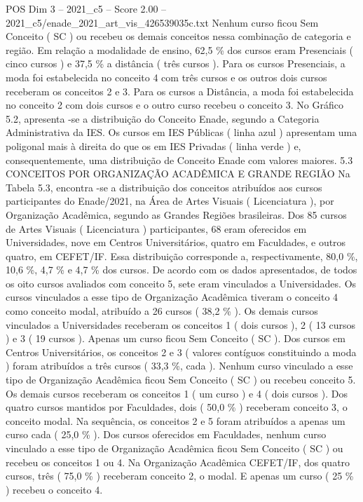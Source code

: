 \begin{textsample}{POS Dim 3 – 2021\_c5 – Score 2.00 – 2021\_c5/enade\_2021\_art\_vis\_426539035c.txt}
Nenhum curso ficou Sem Conceito ( SC ) ou recebeu os demais conceitos nessa combinação de categoria e região.
Em relação a modalidade de ensino, 62,5 \% dos cursos eram Presenciais ( cinco cursos ) e 37,5 \% a distância ( três cursos ).
Para os cursos Presenciais, a moda foi estabelecida no conceito 4 com três cursos e os outros dois cursos receberam os conceitos 2 e 3.
Para os cursos a Distância, a moda foi estabelecida no conceito 2 com dois cursos e o outro curso recebeu o conceito 3.
No Gráfico 5.2, apresenta -se a distribuição do Conceito Enade, segundo a Categoria Administrativa da IES.
Os cursos em IES Públicas ( linha azul ) apresentam uma poligonal mais à direita do que os em IES Privadas ( linha verde ) e, consequentemente, uma distribuição de Conceito Enade com valores maiores. 5.3 CONCEITOS POR ORGANIZAÇÃO ACADÊMICA E GRANDE REGIÃO Na Tabela 5.3, encontra -se a distribuição dos conceitos atribuídos aos cursos participantes do Enade/2021, na Área de Artes Visuais ( Licenciatura ), por Organização Acadêmica, segundo as Grandes Regiões brasileiras.
Dos 85 cursos de Artes Visuais ( Licenciatura ) participantes, 68 eram oferecidos em Universidades, nove em Centros Universitários, quatro em Faculdades, e outros quatro, em CEFET/IF.
Essa distribuição corresponde a, respectivamente, 80,0 \%, 10,6 \%, 4,7 \% e 4,7 \% dos cursos.
De acordo com os dados apresentados, de todos os oito cursos avaliados com conceito 5, sete eram vinculados a Universidades.
Os cursos vinculados a esse tipo de Organização Acadêmica tiveram o conceito 4 como conceito modal, atribuído a 26 cursos ( 38,2 \% ).
Os demais cursos vinculados a Universidades receberam os conceitos 1 ( dois cursos ), 2 ( 13 cursos ) e 3 ( 19 cursos ).
Apenas um curso ficou Sem Conceito ( SC ).
Dos cursos em Centros Universitários, os conceitos 2 e 3 ( valores contíguos constituindo a moda ) foram atribuídos a três cursos ( 33,3 \%, cada ).
Nenhum curso vinculado a esse tipo de Organização Acadêmica ficou Sem Conceito ( SC ) ou recebeu conceito 5.
Os demais cursos receberam os conceitos 1 ( um curso ) e 4 ( dois cursos ).
Dos quatro cursos mantidos por Faculdades, dois ( 50,0 \% ) receberam conceito 3, o conceito modal.
Na sequência, os conceitos 2 e 5 foram atribuídos a apenas um curso cada ( 25,0 \% ).
Dos cursos oferecidos em Faculdades, nenhum curso vinculado a esse tipo de Organização Acadêmica ficou Sem Conceito ( SC ) ou recebeu os conceitos 1 ou 4.
Na Organização Acadêmica CEFET/IF, dos quatro cursos, três ( 75,0 \% ) receberam conceito 2, o modal.
E apenas um curso ( 25 \% ) recebeu o conceito 4.

\end{textsample}
